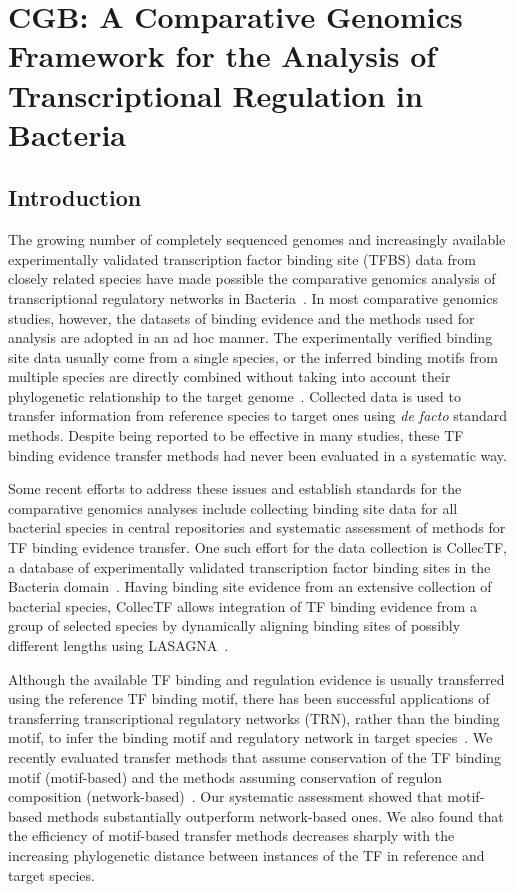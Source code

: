 \chapter{CGB: A Comparative Genomics Framework for the Analysis of
  Transcriptional Regulation in Bacteria}
\section{Introduction}

The growing number of completely sequenced genomes and increasingly available
experimentally validated transcription factor binding site (TFBS) data from
closely related species have made possible the comparative genomics analysis of
transcriptional regulatory networks in Bacteria~\cite{makarova2001conservation,
  rodionov2007comparative, babu2004structure}. In most comparative genomics
studies, however, the datasets of binding evidence and the methods used for
analysis are adopted in an ad hoc manner. The experimentally verified binding
site data usually come from a single species, or the inferred binding motifs
from multiple species are directly combined without taking into account their
phylogenetic relationship to the target genome~\cite{erill2004differences,
  novichkov2010regpredict, ravcheev2013genomic, leyn2014comparative,
  kazakov2009comparative, rodionov2008transcriptional}. Collected data is used
to transfer information from reference species to target ones using \textit{de
  facto} standard methods. Despite being reported to be effective in many
studies, these TF binding evidence transfer methods had never been evaluated in
a systematic way.

Some recent efforts to address these issues and establish standards for the
comparative genomics analyses include collecting binding site data for all
bacterial species in central repositories and systematic assessment of methods
for TF binding evidence transfer. One such effort for the data collection is
CollecTF, a database of experimentally validated transcription factor binding
sites in the Bacteria domain~\cite{kilic2013collectf}. Having binding site
evidence from an extensive collection of bacterial species, CollecTF allows
integration of TF binding evidence from a group of selected species by
dynamically aligning binding sites of possibly different lengths using
LASAGNA~\cite{lee2013lasagna}.

Although the available TF binding and regulation evidence is usually
transferred using the reference TF binding motif, there has been successful
applications of transferring transcriptional regulatory networks (TRN), rather
than the binding motif, to infer the binding motif and regulatory network in
target species~\cite{babu2008computational, novichkov2010regpredict}. We
recently evaluated transfer methods that assume conservation of the TF binding
motif (motif-based) and the methods assuming conservation of regulon
composition (network-based)~\cite{kilic2015assessment}. Our systematic
assessment showed that motif-based methods substantially outperform
network-based ones. We also found that the efficiency of motif-based transfer
methods decreases sharply with the increasing phylogenetic distance between
instances of the TF in reference and target species.

